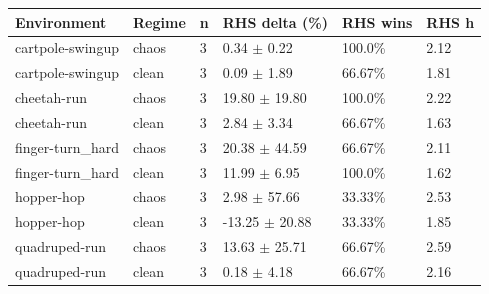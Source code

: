 \begin{tabular}{llllll}
\toprule
Environment & Regime & n & RHS delta (\%) & RHS wins & RHS h \\
\midrule
cartpole-swingup & chaos & 3 & 0.34 $\pm$ 0.22 & 100.0\% & 2.12 \\
cartpole-swingup & clean & 3 & 0.09 $\pm$ 1.89 & 66.67\% & 1.81 \\
cheetah-run & chaos & 3 & 19.80 $\pm$ 19.80 & 100.0\% & 2.22 \\
cheetah-run & clean & 3 & 2.84 $\pm$ 3.34 & 66.67\% & 1.63 \\
finger-turn\_hard & chaos & 3 & 20.38 $\pm$ 44.59 & 66.67\% & 2.11 \\
finger-turn\_hard & clean & 3 & 11.99 $\pm$ 6.95 & 100.0\% & 1.62 \\
hopper-hop & chaos & 3 & 2.98 $\pm$ 57.66 & 33.33\% & 2.53 \\
hopper-hop & clean & 3 & -13.25 $\pm$ 20.88 & 33.33\% & 1.85 \\
quadruped-run & chaos & 3 & 13.63 $\pm$ 25.71 & 66.67\% & 2.59 \\
quadruped-run & clean & 3 & 0.18 $\pm$ 4.18 & 66.67\% & 2.16 \\
\bottomrule
\end{tabular}
